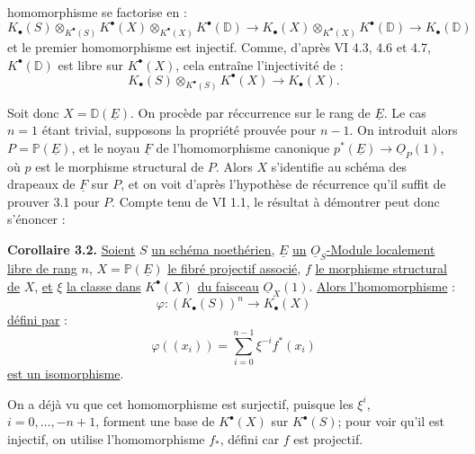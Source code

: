 
homomorphisme se factorise en :
\[
K_\bullet(S)\otimes_{K^{\bullet}(S)}K^{\bullet}(X)\otimes_{K^{\bullet}(X)}K^{\bullet}(\mathbb D)
\longrightarrow K_\bullet(X)\otimes_{K^{\bullet}(X)}K^{\bullet}(\mathbb D)
\longrightarrow K_\bullet(\mathbb D)
\]
et le premier homomorphisme est injectif. Comme, d'après VI 4.3, 4.6 et 4.7, $K^{\bullet}(\mathbb D)$ est libre sur $K^{\bullet}(X)$, cela entraîne l'injectivité de :
\[
K_\bullet(S)\otimes_{K^{\bullet}(S)}K^{\bullet}(X)\to K_\bullet(X).
\]

Soit donc $X=\mathbb D(\underline{E})$. On procède par réccurrence sur le rang de $\underline{E}$. Le cas $n=1$ étant trivial, supposons la propriété prouvée pour $n-1$. On introduit alors $P=\mathbb P(\underline{E})$, et le noyau $\underline{F}$ de l'homomorphisme canonique $p^*(\underline{E})\to \underline{O}_P(1)$, où $p$ est le morphisme structural de $P$. Alors $X$ s'identifie au schéma des drapeaux de $\underline{F}$ sur $P$, et on voit d'après l'hypothèse de récurrence qu'il suffit de prouver 3.1 pour $P$. Compte tenu de VI 1.1, le résultat à démontrer peut donc s'énoncer :

\textbf{Corollaire 3.2.} \uline{Soient} $S$ \uline{un schéma noethérien}, $\underline{E}$ \uline{un} $\underline{O}_S$\uline{-Module localement libre de rang} $n$, $X=\mathbb P(\underline{E})$ \uline{le fibré projectif associé}, $f$ \uline{le morphisme structural de} $X$, \uline{et} $\xi$ \uline{la classe dans} $K^{\bullet}(X)$ \uline{du faisceau} $\underline{O}_X(1)$. \uline{Alors l'homomorphisme} :
\[
\varphi:(K_\bullet(S))^n\longrightarrow K_\bullet(X)
\]
\uline{défini par} :
\[
\varphi((x_i))=\sum_{i=0}^{n-1}\xi^{-i}f^*(x_i)
\]
\uline{est un isomorphisme}.

On a déjà vu que cet homomorphisme est surjectif, puisque les $\xi^i$, $i=0,\ldots,-n+1$, forment une base de $K^{\bullet}(X)$ sur $K^{\bullet}(S)$; pour voir qu'il est injectif, on utilise l'homomorphisme $f_*$, défini car $f$ est projectif.
